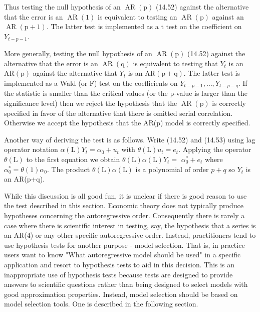 \documentclass[10pt]{article}
\begin{document}
Thus testing the null hypothesis of an $\operatorname{AR}(\mathrm{p})$ (14.52) against the alternative that the error is an $\operatorname{AR}(1)$ is equivalent to testing an $\operatorname{AR}(\mathrm{p})$ against an $\operatorname{AR}(\mathrm{p}+1)$. The latter test is implemented as a t test on the coefficient on $Y_{t-p-1}$.

More generally, testing the null hypothesis of an $\operatorname{AR}(\mathrm{p})$ (14.52) against the alternative that the error is an $\operatorname{AR}(\mathrm{q})$ is equivalent to testing that $Y_{t}$ is an $\mathrm{AR}(\mathrm{p})$ against the alternative that $Y_{t}$ is an $\mathrm{AR}(\mathrm{p}+\mathrm{q})$. The latter test is implemented as a Wald (or F) test on the coefficients on $Y_{t-p-1}, \ldots, Y_{t-p-q}$. If the statistic is smaller than the critical values (or the p-value is larger than the significance level) then we reject the hypothesis that the $\operatorname{AR}(\mathrm{p})$ is correctly specified in favor of the alternative that there is omitted serial correlation. Otherwise we accept the hypothesis that the AR(p) model is correctly specified.

Another way of deriving the test is as follows. Write (14.52) and (14.53) using lag operator notation $\alpha(\mathrm{L}) Y_{t}=\alpha_{0}+u_{t}$ with $\theta(\mathrm{L}) u_{t}=e_{t}$. Applying the operator $\theta(\mathrm{L})$ to the first equation we obtain $\theta(\mathrm{L}) \alpha(\mathrm{L}) Y_{t}=$ $\alpha_{0}^{*}+e_{t}$ where $\alpha_{0}^{*}=\theta(1) \alpha_{0}$. The product $\theta(\mathrm{L}) \alpha(\mathrm{L})$ is a polynomial of order $p+q$ so $Y_{t}$ is an AR(p+q).

While this discussion is all good fun, it is unclear if there is good reason to use the test described in this section. Economic theory does not typically produce hypotheses concerning the autoregressive order. Consequently there is rarely a case where there is scientific interest in testing, say, the hypothesis that a series is an AR(4) or any other specific autoregressive order. Instead, practitioners tend to use hypothesis tests for another purpose - model selection. That is, in practice users want to know "What autoregressive model should be used" in a specific application and resort to hypothesis tests to aid in this decision. This is an inappropriate use of hypothesis tests because tests are designed to provide answers to scientific questions rather than being designed to select models with good approximation properties. Instead, model selection should be based on model selection tools. One is described in the following section.
\end{document}

